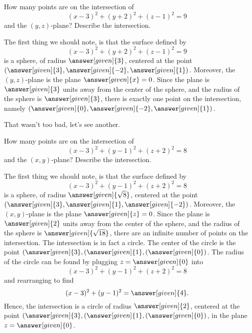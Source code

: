 \documentclass{ximera}
\begin{document}
\begin{example}
  How many points are on the intersection of
  \[
  (x-3)^2 + (y+2)^2 + (z-1)^2 = 9
  \]
  and the $(y,z)$-plane? Describe the intersection.
  \begin{explanation}
    The first thing we should note, is that the surface defined by
    \[
    (x-3)^2 + (y+2)^2 + (z-1)^2 = 9
    \]
    is a sphere, of radius $\answer[given]{3}$, centered at the point
    $(\answer[given]{3},\answer[given]{-2},\answer[given]{1})$. Moreover,
    the $(y,z)$-plane is the plane $\answer[given]{x}=0$. Since the
    plane is $\answer[given]{3}$ units away from the center of the
    sphere, and the radius of the sphere is $\answer[given]{3}$, there
    is exactly one point on the intersection, namely
    $(\answer[given]{0},\answer[given]{-2},\answer[given]{1})$.
  \end{explanation}
\end{example}

That wasn't too bad, let's see another.

\begin{example}
  How many points are on the intersection of
  \[
  (x-3)^2 + (y-1)^2 + (z+2)^2 = 8
  \]
  and the $(x,y)$-plane? Describe the intersection.
  \begin{explanation}
    The first thing we should note, is that the surface defined by
    \[
    (x-3)^2 + (y-1)^2 + (z+2)^2 = 8
    \]
    is a sphere, of radius $\answer[given]{\sqrt{8}}$, centered at the
    point
    $(\answer[given]{3},\answer[given]{1},\answer[given]{-2})$. Moreover,
    the $(x,y)$-plane is the plane $\answer[given]{z}=0$. Since the
    plane is $\answer[given]{2}$ units away from the center of the
    sphere, and the radius of the sphere is
    $\answer[given]{\sqrt{18}}$, there are an infinite number of
    points on the intersection. The intersection is in fact a
    circle. The center of the circle is the point
    $(\answer[given]{3},(\answer[given]{1},(\answer[given]{0})$. The
    radius of the circle can be found by plugging
    $z=\answer[given]{0}$ into
    \[
    (x-3)^2 + (y-1)^2 + (z+2)^2 = 8
    \]
    and rearranging to find
    \[
    (x-3)^2 + (y-1)^2  = \answer[given]{4}.
    \]
    Hence, the intersection is a circle of radius $\answer[given]{2}$,
    centered at the point
    $(\answer[given]{3},(\answer[given]{1},(\answer[given]{0})$, in
    the plane $z=\answer[given]{0}$.
  \end{explanation}
\end{example}
\end{document}
